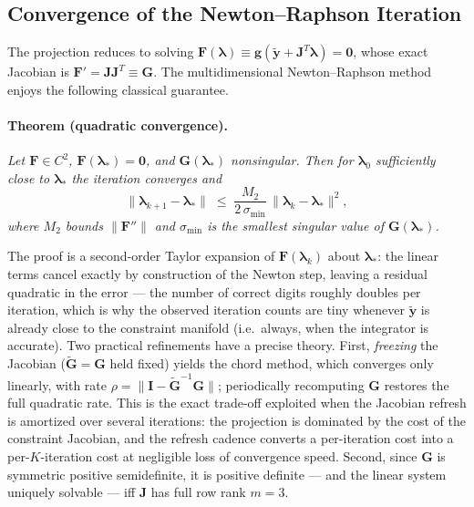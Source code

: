 \documentclass[11pt]{book}
\begin{document}
\subsection{Convergence of the Newton--Raphson Iteration}
The projection reduces to solving $\bm{F}(\bm{\lambda}) \equiv
\bm{g}\!\left(\tilde{\bm{y}} + \bm{J}^{T}\bm{\lambda}\right) = \bm{0}$, whose exact
Jacobian is $\bm{F}' = \bm{J}\bm{J}^{T} \equiv \bm{G}$. The multidimensional
Newton--Raphson method enjoys the following classical guarantee.

\paragraph{Theorem (quadratic convergence).}
\emph{Let $\bm{F} \in C^2$, $\bm{F}(\bm{\lambda}_*) = \bm{0}$, and $\bm{G}(\bm{\lambda}_*)$ nonsingular. Then for $\bm{\lambda}_0$ sufficiently close to $\bm{\lambda}_*$ the
iteration converges and}
\begin{equation}
    \|\bm{\lambda}_{k+1} - \bm{\lambda}_*\| \;\le\;
    \frac{M_2}{2\,\sigma_{\min}}\,
    \|\bm{\lambda}_k - \bm{\lambda}_*\|^2 ,
\end{equation}
\emph{where $M_2$ bounds $\|\bm{F}''\|$ and $\sigma_{\min}$ is the smallest singular
value of $\bm{G}(\bm{\lambda}_*)$.}

The proof is a second-order Taylor expansion of $\bm{F}(\bm{\lambda}_k)$ about
 $\bm{\lambda}_*$: the linear terms cancel exactly by construction of the Newton step,
leaving a residual quadratic in the error --- the number of correct digits roughly
doubles per iteration, which is why the observed iteration counts are tiny whenever
 $\tilde{\bm{y}}$ is already close to the constraint manifold (i.e.\ always, when the
integrator is accurate). Two practical refinements have a precise theory. First,
\emph{freezing} the Jacobian ($\tilde{\bm{G}} = \bm{G}$ held fixed) yields the chord
method, which converges only linearly, with rate $\rho = \|\bm{I} -
\tilde{\bm{G}}^{-1}\bm{G}\|$; periodically recomputing $\bm{G}$ restores the full
quadratic rate. This is the exact trade-off exploited when the Jacobian refresh is
amortized over several iterations: the projection is dominated by the cost of the
constraint Jacobian, and the refresh cadence converts a per-iteration cost into a
per-$K$-iteration cost at negligible loss of convergence speed. Second, since
 $\bm{G}$ is symmetric positive semidefinite, it is positive definite --- and the
linear system uniquely solvable --- iff $\bm{J}$ has full row rank $m = 3$.
\end{document}

